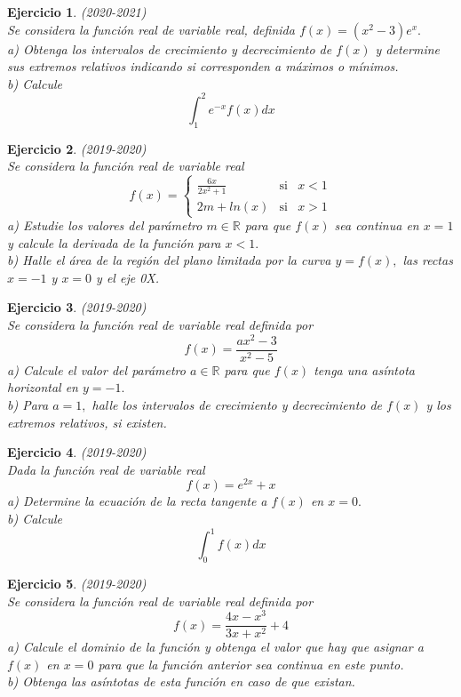 \documentclass[12pt, a4paper]{amsart}
\newtheorem{ejer}{Ejercicio}
\begin{document}
\begin{ejer}\em (2020-2021)\\
Se considera la función real de variable real, definida $f(x) = (x^2 - 3)e^x.$\\
a) Obtenga los intervalos de crecimiento y decrecimiento de $f(x)$ y determine sus extremos relativos indicando si corresponden a máximos o mínimos.\\
b) Calcule 
\[\int_1^2e^{-x}f(x)dx\]
\end{ejer}

\begin{ejer}\em (2019-2020)\\
Se considera la función real de variable real
\[
f(x)=\left \{ \begin{matrix}
\frac{6x}{2x^2+1} & \text{si} & x< 1\\
2m+ln(x) & \text{si} & x> 1
\end{matrix}\right.
\]
a) Estudie los valores del parámetro $m\in\mathbb{R}$ para que $f (x)$ sea continua en $x = 1$ y calcule la derivada de la función para $x < 1 .$\\
b) Halle el área de la región del plano limitada por la curva $y = f (x) ,$ las rectas $x= -1$ y $x = 0$ y el eje 0X.
\end{ejer}

\begin{ejer}\em (2019-2020)\\
Se considera la función real de variable real definida por
\[f(x) =\frac{ax^2-3}{x^2-5}\]
a) Calcule el valor del parámetro $a\in \mathbb{R}$ para que $f (x)$ tenga una asíntota horizontal en $y = -1 .$\\
b) Para $a = 1,$ halle los intervalos de crecimiento y decrecimiento de $f (x)$ y los extremos relativos, si existen.
\end{ejer}

\begin{ejer}\em (2019-2020)\\
Dada la función real de variable real
\[f (x) = e^{2x} + x\]
a) Determine la ecuación de la recta tangente a $f (x)$ en $x = 0.$\\
b) Calcule
\[\int_0^1 f(x)dx\]
\end{ejer}

\begin{ejer}\em (2019-2020)\\
Se considera la función real de variable real definida por
\[f(x)=\frac{4x-x^3}{3x+x^2}+4\]
a) Calcule el dominio de la función y obtenga el valor que hay que asignar a $f (x)$ en $x = 0$ para que la función anterior sea continua en este punto.\\
b) Obtenga las asíntotas de esta función en caso de que existan.
\end{ejer}
\end{document}
